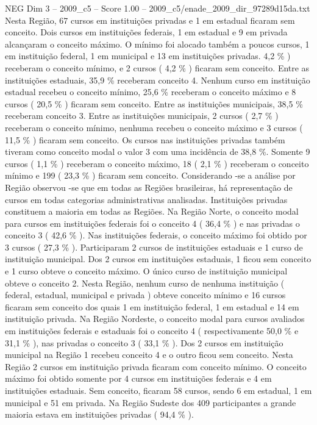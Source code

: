 \begin{textsample}{NEG Dim 3 – 2009\_c5 – Score 1.00 – 2009\_c5/enade\_2009\_dir\_97289d15da.txt}
Nesta Região, 67 cursos em instituições privadas e 1 em estadual ficaram sem conceito.
Dois cursos em instituições federais, 1 em estadual e 9 em privada alcançaram o conceito máximo.
O mínimo foi alocado também a poucos cursos, 1 em instituição federal, 1 em municipal e 13 em instituições privadas. 4,2 \% ) receberam o conceito mínimo, e 2 cursos ( 4,2 \% ) ficaram sem conceito.
Entre as instituições estaduais, 35,9 \% receberam conceito 4.
Nenhum curso em instituição estadual recebeu o conceito mínimo, 25,6 \% receberam o conceito máximo e 8 cursos ( 20,5 \% ) ficaram sem conceito.
Entre as instituições municipais, 38,5 \% receberam conceito 3.
Entre as instituições municipais, 2 cursos ( 2,7 \% ) receberam o conceito mínimo, nenhuma recebeu o conceito máximo e 3 cursos ( 11,5 \% ) ficaram sem conceito.
Os cursos nas instituições privadas também tiveram como conceito modal o valor 3 com uma incidência de 38,8 \%.
Somente 9 cursos ( 1,1 \% ) receberam o conceito máximo, 18 ( 2,1 \% ) receberam o conceito mínimo e 199 ( 23,3 \% ) ficaram sem conceito.
Considerando -se a análise por Região observou -se que em todas as Regiões brasileiras, há representação de cursos em todas categorias administrativas analisadas.
Instituições privadas constituem a maioria em todas as Regiões.
Na Região Norte, o conceito modal para cursos em instituições federais foi o conceito 4 ( 36,4 \% ) e nas privadas o conceito 3 ( 42,6 \% ).
Nas instituições federais, o conceito máximo foi obtido por 3 cursos ( 27,3 \% ).
Participaram 2 cursos de instituições estaduais e 1 curso de instituição municipal.
Dos 2 cursos em instituições estaduais, 1 ficou sem conceito e 1 curso obteve o conceito máximo.
O único curso de instituição municipal obteve o conceito 2.
Nesta Região, nenhum curso de nenhuma instituição ( federal, estadual, municipal e privada ) obteve conceito mínimo e 16 cursos ficaram sem conceito dos quais 1 em instituição federal, 1 em estadual e 14 em instituição privada.
Na Região Nordeste, o conceito modal para cursos avaliados em instituições federais e estaduais foi o conceito 4 ( respectivamente 50,0 \% e 31,1 \% ), nas privadas o conceito 3 ( 33,1 \% ).
Dos 2 cursos em instituição municipal na Região 1 recebeu conceito 4 e o outro ficou sem conceito.
Nesta Região 2 cursos em instituição privada ficaram com conceito mínimo.
O conceito máximo foi obtido somente por 4 cursos em instituições federais e 4 em instituições estaduais.
Sem conceito, ficaram 58 cursos, sendo 6 em estadual, 1 em municipal e 51 em privada.
Na Região Sudeste dos 409 participantes a grande maioria estava em instituições privadas ( 94,4 \% ).

\end{textsample}
